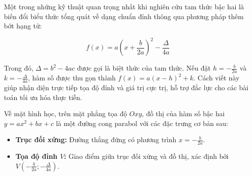 \documentclass[14pt, a4paper, oneside]{extreport}
\begin{document}
Một trong những kỹ thuật quan trọng nhất khi nghiên cứu tam thức bậc hai là biến đổi biểu thức tổng quát về dạng chuẩn đỉnh thông qua phương pháp thêm bớt hạng tử:

\begin{tcolorbox}[colback=blue!5!white,colframe=blue!65!black,title=Dạng chuẩn đỉnh của tam thức bậc hai,center,width=0.85\textwidth,arc=3mm]
\begin{equation*}
    f(x) = a\left(x + \frac{b}{2a}\right)^2 - \frac{\Delta}{4a}
\end{equation*}
\end{tcolorbox}

Trong đó, $\Delta = b^2 - 4ac$ được gọi là biệt thức của tam thức. Nếu đặt $h = -\frac{b}{2a}$ và $k = -\frac{\Delta}{4a}$, hàm số được thu gọn thành $f(x) = a(x - h)^2 + k$. Cách viết này giúp nhận diện trực tiếp tọa độ đỉnh và giá trị cực trị, hỗ trợ đắc lực cho các bài toán tối ưu hóa thực tiễn.

\vspace{0.2cm}
Về mặt hình học, trên mặt phẳng tọa độ $Oxy$, đồ thị của hàm số bậc hai $y = ax^2 + bx + c$ là một đường cong parabol với các đặc trưng cơ bản sau:

\begin{tcolorbox}[colback=blue!5!white,colframe=blue!60!black,title=Các đặc trưng hình học của Parabol,center,width=0.85\textwidth,arc=3mm]
\begin{itemize}
    \item \textbf{Trục đối xứng:} Đường thẳng đứng có phương trình $x = -\frac{b}{2a}$.
    \item \textbf{Tọa độ đỉnh $V$:} Giao điểm giữa trục đối xứng và đồ thị, xác định bởi $V\left(-\frac{b}{2a}; -\frac{\Delta}{4a}\right)$.
\end{itemize}
\end{tcolorbox}
\end{document}
